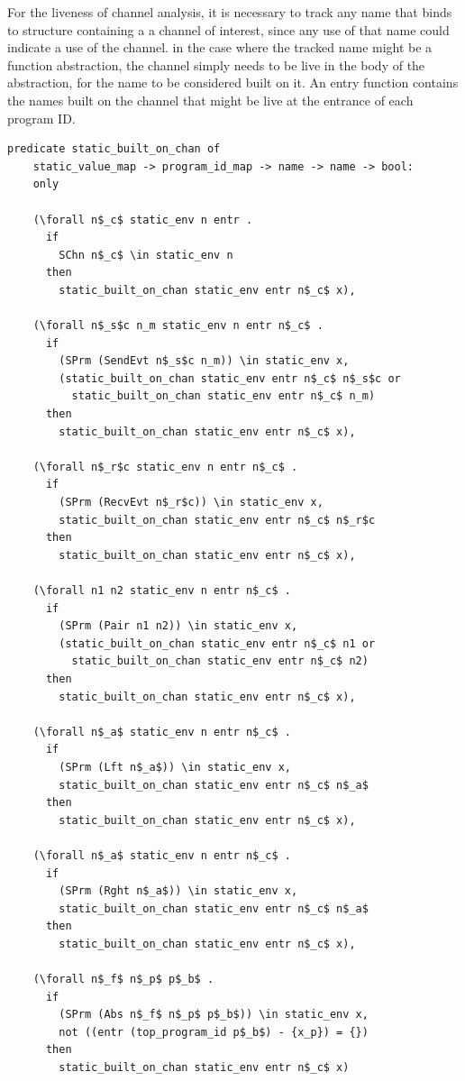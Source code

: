 \documentclass[10pt]{article}
\begin{document}
For the liveness of channel analysis, it is necessary to track any name that binds to structure
containing a a channel of interest, since any use of that name could indicate a use of the
channel. in the case where the tracked name might be a function abstraction, the channel simply
needs to be live in the body of the abstraction, for the name to be considered built on it.
An entry function contains the names built on the channel that might be live at the entrance
of each program ID.

\begin{lstlisting}[language=logic, mathescape]
  predicate static_built_on_chan of
    static_value_map -> program_id_map -> name -> name -> bool:
    only

    (\forall n$_c$ static_env n entr .
      if 
        SChn n$_c$ \in static_env n 
      then 
        static_built_on_chan static_env entr n$_c$ x),

    (\forall n$_s$c n_m static_env n entr n$_c$ . 
      if
        (SPrm (SendEvt n$_s$c n_m)) \in static_env x,
        (static_built_on_chan static_env entr n$_c$ n$_s$c or
          static_built_on_chan static_env entr n$_c$ n_m)
      then 
        static_built_on_chan static_env entr n$_c$ x),

    (\forall n$_r$c static_env n entr n$_c$ . 
      if  
        (SPrm (RecvEvt n$_r$c)) \in static_env x,
        static_built_on_chan static_env entr n$_c$ n$_r$c
      then 
        static_built_on_chan static_env entr n$_c$ x),

    (\forall n1 n2 static_env n entr n$_c$ . 
      if  
        (SPrm (Pair n1 n2)) \in static_env x,
        (static_built_on_chan static_env entr n$_c$ n1 or
          static_built_on_chan static_env entr n$_c$ n2)
      then 
        static_built_on_chan static_env entr n$_c$ x),

    (\forall n$_a$ static_env n entr n$_c$ .
      if
        (SPrm (Lft n$_a$)) \in static_env x,
        static_built_on_chan static_env entr n$_c$ n$_a$
      then 
        static_built_on_chan static_env entr n$_c$ x),

    (\forall n$_a$ static_env n entr n$_c$ .
      if
        (SPrm (Rght n$_a$)) \in static_env x,
        static_built_on_chan static_env entr n$_c$ n$_a$
      then 
        static_built_on_chan static_env entr n$_c$ x),

    (\forall n$_f$ n$_p$ p$_b$ .
      if
        (SPrm (Abs n$_f$ n$_p$ p$_b$)) \in static_env x,
        not ((entr (top_program_id p$_b$) - {x_p}) = {})
      then
        static_built_on_chan static_env entr n$_c$ x)
  \end{lstlisting}
\end{document}
